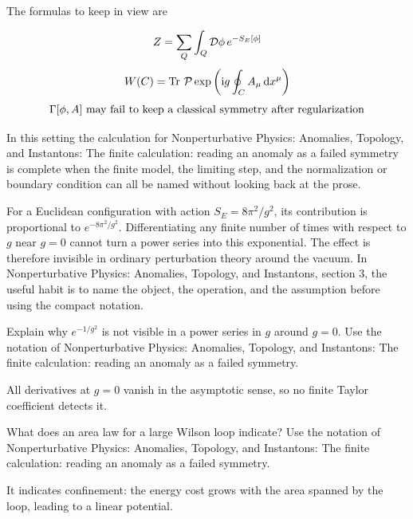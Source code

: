 The formulas to keep in view are

\[
  Z=\sum_Q\int_Q\mathcal D\phi\,e^{-S_E[\phi]}
\]
\[
  W(C)=\operatorname{Tr}\,\mathcal P\exp\left(\mathrm i g\oint_C A_\mu\,\mathrm d x^\mu\right)
\]
\[
  \Gamma[\phi,A]\hbox{ may fail to keep a classical symmetry after regularization}
\]

In this setting the calculation for Nonperturbative Physics: Anomalies, Topology, and Instantons: The finite calculation: reading an anomaly as a failed symmetry is complete when the finite model, the limiting step, and the normalization or boundary condition can all be named without looking back at the prose.




\begin{example}
For a Euclidean configuration with action \(S_E=8\pi^2/g^2\), its contribution is proportional to \(e^{-8\pi^2/g^2}\).  Differentiating any finite number of times with respect to \(g\) near \(g=0\) cannot turn a power series into this exponential.  The effect is therefore invisible in ordinary perturbation theory around the vacuum.  In Nonperturbative Physics: Anomalies, Topology, and Instantons, section 3, the useful habit is to name the object, the operation, and the assumption before using the compact notation.
\end{example}



\begin{exercise}
Explain why \(e^{-1/g^2}\) is not visible in a power series in \(g\) around \(g=0\).  Use the notation of Nonperturbative Physics: Anomalies, Topology, and Instantons: The finite calculation: reading an anomaly as a failed symmetry.
\begin{answer}
All derivatives at \(g=0\) vanish in the asymptotic sense, so no finite Taylor coefficient detects it.
\end{answer}
\end{exercise}

\begin{exercise}
What does an area law for a large Wilson loop indicate?  Use the notation of Nonperturbative Physics: Anomalies, Topology, and Instantons: The finite calculation: reading an anomaly as a failed symmetry.
\begin{answer}
It indicates confinement: the energy cost grows with the area spanned by the loop, leading to a linear potential.
\end{answer}
\end{exercise}



